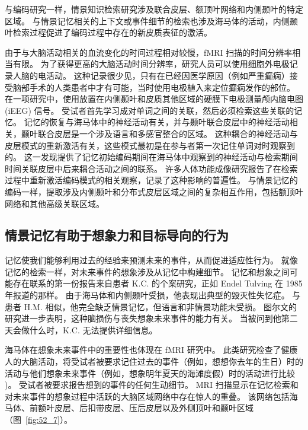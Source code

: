 与编码研究一样，情景知识检索研究涉及联合皮层、额顶叶网络和内侧颞叶的特定区域。
与情景记忆相关的上下文或事件细节的检索也涉及海马体的活动，内侧颞叶检索过程促进了编码过程中存在的新皮质表征的激活。


由于与大脑活动相关的血流变化的时间过程相对较慢，fMRI 扫描的时间分辨率相当有限。
为了获得更高的大脑活动时间分辨率，研究人员可以使用细胞外电极记录人脑的电活动。
这种记录很少见，只有在已经因医学原因（例如严重癫痫）接受脑部手术的人类患者中才有可能，当时使用电极植入来定位癫痫发作的部位。
在一项研究中，使用放置在内侧颞叶和皮质其他区域的硬膜下电极测量颅内脑电图 (iEEG) 信号。
受试者首先学习成对单词之间的关联，然后必须检索这些关联的记忆。
记忆的恢复与海马体中的神经活动有关，并与颞叶联合皮层中的神经活动相关，颞叶联合皮层是一个涉及语言和多感官整合的区域。
这种耦合的神经活动与皮层模式的重新激活有关，这些模式最初是在参与者第一次记住单词对时观察到的。
这一发现提供了记忆初始编码期间在海马体中观察到的神经活动与检索期间时间关联皮层中后来耦合活动之间的联系。
许多人体功能成像研究报告了在检索过程中重新激活编码模式的相关观察，记录了这种影响的普遍性。
与情景记忆的编码一样，提取涉及内侧颞叶和分布式皮层区域之间的复杂相互作用，包括额顶叶网络和其他高级关联区域。



\subsection{情景记忆有助于想象力和目标导向的行为}

记忆使我们能够利用过去的经验来预测未来的事件，从而促进适应性行为。
就像记忆的检索一样，对未来事件的想象涉及从记忆中构建细节。
记忆和想象之间可能存在联系的第一份报告来自患者 K.C. 的个案研究，正如 Endel Tulving 在 1985 年报道的那样。
由于海马体和内侧颞叶受损，他表现出典型的毁灭性失忆症。
与患者 H.M. 相似，他完全缺乏情景记忆，但语言和非情景功能未受损。
图尔文的研究进一步表明，这种脑损伤与丧失想象未来事件的能力有关。
当被问到他第二天会做什么时，K.C. 无法提供详细信息。


海马体在想象未来事件中的重要性也体现在 fMRI 研究中。
此类研究检查了健康人的大脑活动，将受试者被要求记住过去的事件（例如，想想你去年的生日）时的活动与他们想象未来事件（例如，想象明年夏天的海滩度假）时的活动进行比较 )。
受试者被要求报告想到的事件的任何生动细节。
MRI 扫描显示在记忆检索和对未来事件的想象过程中活跃的大脑区域网络中存在惊人的重叠。
该网络包括海马体、前额叶皮层、后扣带皮层、压后皮层以及外侧顶叶和颞叶区域（图~\ref{fig:52_7}）。


